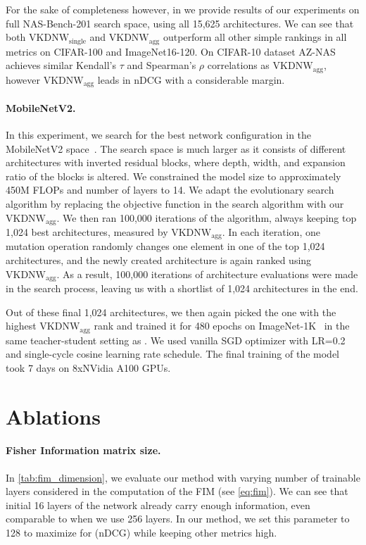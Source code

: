 For the sake of completeness however, in  we provide results of our experiments on full NAS-Bench-201 search space, using all 15,625 architectures. We can see that both $\text{VKDNW}_{\text{single}}$ and $\text{VKDNW}_{\text{agg}}$ outperform all other simple rankings in all metrics on CIFAR-100 and ImageNet16-120. On CIFAR-10 dataset AZ-NAS\cite{lee2024az} achieves similar Kendall's $\tau$ and Spearman's $\rho$ correlations as $\text{VKDNW}_{\text{agg}}$, however $\text{VKDNW}_{\text{agg}}$ leads in nDCG with a considerable margin.

\paragraph{MobileNetV2.}
In this experiment, we search for the best network configuration in the MobileNetV2 space~\cite{sandler2018mobilenetv2}. The search space is much larger as it consists of different architectures with inverted residual blocks, where depth, width, and expansion ratio of the blocks is altered. We constrained the model size to approximately 450M FLOPs and number of layers to 14. We adapt the evolutionary search algorithm \cite{lee2024az} by replacing the objective function in the search algorithm with our $\text{VKDNW}_{\text{agg}}$.
We then ran 100,000 iterations of the algorithm, always keeping top 1,024 best architectures, measured by $\text{VKDNW}_{\text{agg}}$. In each iteration, one mutation operation randomly changes one element in one of the top 1,024 architectures, and the newly created architecture is again ranked using $\text{VKDNW}_{\text{agg}}$. As a result, 100,000 iterations of architecture evaluations were made in the search process, leaving us with a shortlist of 1,024 architectures in the end.

Out of these final 1,024 architectures, we then again picked the one with the highest $\text{VKDNW}_{\text{agg}}$ rank and trained it for 480 epochs on ImageNet-1K~\cite{deng2009imagenet} in the same teacher-student setting as \cite{li2023zico, lee2024az}. We used vanilla SGD optimizer with LR=0.2 and single-cycle cosine learning rate schedule. The final training of the model took 7 days on 8xNVidia A100 GPUs.

\section{Ablations}


\paragraph{Fisher Information matrix size.}
In \cref{tab:fim_dimension}, we evaluate our method with varying number of trainable layers considered in the computation of the FIM (see \cref{eq:fim}). We can see that initial 16 layers of the network already carry enough information, even comparable to when we use 256 layers. In our method, we set this parameter to 128 to maximize for (nDCG) while keeping other metrics high.

